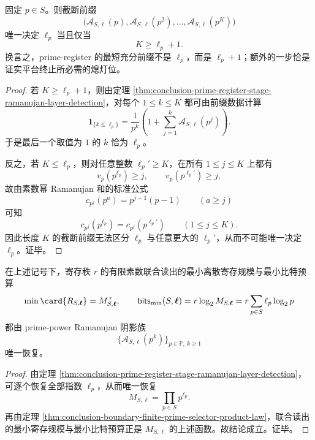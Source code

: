 \begin{theorem}\label{thm:conclusion-prime-register-stage-ramanujan-exact-cutoff}
固定 \(p\in S\)。则截断前缀
\[
\bigl(
\mathcal A_{S,\boldsymbol\ell}(p),
\mathcal A_{S,\boldsymbol\ell}(p^2),
\dots,
\mathcal A_{S,\boldsymbol\ell}(p^K)
\bigr)
\]
唯一决定 \(\ell_p\) 当且仅当
\[
K\ge \ell_p+1.
\]
换言之，prime-register 的最短充分前缀不是 \(\ell_p\)，而是 \(\ell_p+1\)；额外的一步恰是证实平台终止所必需的熄灯位。
\end{theorem}
\begin{proof}
若 \(K\ge \ell_p+1\)，则由定理 \ref{thm:conclusion-prime-register-stage-ramanujan-layer-detection}，对每个 \(1\le k\le K\) 都可由前缀数据计算
\[
\mathbf 1_{\{k\le \ell_p\}}
=
\frac{1}{p^k}\left(
1+\sum_{j=1}^{k}\mathcal A_{S,\boldsymbol\ell}(p^j)
\right).
\]
于是最后一个取值为 \(1\) 的 \(k\) 恰为 \(\ell_p\)。

反之，若 \(K\le \ell_p\)，则对任意整数 \(\ell_p'\ge K\)，在所有 \(1\le j\le K\) 上都有
\[
v_p\!\left(p^{\ell_p}\right)\ge j,
\qquad
v_p\!\left(p^{\ell_p'}\right)\ge j,
\]
故由素数幂 Ramanujan 和的标准公式
\[
c_{p^j}(p^a)=p^{j-1}(p-1)
\qquad (a\ge j)
\]
可知
\[
c_{p^j}(p^{\ell_p})=c_{p^j}(p^{\ell_p'})
\qquad (1\le j\le K).
\]
因此长度 \(K\) 的截断前缀无法区分 \(\ell_p\) 与任意更大的 \(\ell_p'\)，从而不可能唯一决定 \(\ell_p\)。证毕。
\end{proof}

\begin{corollary}\label{cor:conclusion-prime-register-stage-ramanujan-shadow-recovers-budget}
在上述记号下，寄存秩 \(r\) 的有限素数联合读出的最小离散寄存规模与最小比特预算
\[
\min\card{R_{S,\boldsymbol\ell}}=M_{S,\boldsymbol\ell}^{\,r},
\qquad
\mathsf{bits}_{\min}(S,\boldsymbol\ell)=r\log_2 M_{S,\boldsymbol\ell}
=
r\sum_{p\in S}\ell_p\log_2 p
\]
都由 prime-power Ramanujan 阴影族
\[
\bigl\{\mathcal A_{S,\boldsymbol\ell}(p^k)\bigr\}_{p\in \mathbb P,\ k\ge 1}
\]
唯一恢复。
\end{corollary}
\begin{proof}
由定理 \ref{thm:conclusion-prime-register-stage-ramanujan-layer-detection}，可逐个恢复全部指数 \(\ell_p\)，从而唯一恢复
\[
M_{S,\boldsymbol\ell}=\prod_{p\in S}p^{\ell_p}.
\]
再由定理 \ref{thm:conclusion-boundary-finite-prime-selector-product-law}，联合读出的最小寄存规模与最小比特预算正是 \(M_{S,\boldsymbol\ell}\) 的上述函数。故结论成立。证毕。
\end{proof}

